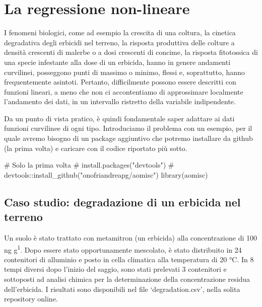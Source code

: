 \documentclass[a4paper,12pt,oneside]{book}
\newenvironment{Shaded}{\begin{snugshade}}{\end{snugshade}}
\newcommand{\CommentTok}[1]{#1}
\newcommand{\FunctionTok}[1]{#1}
\newcommand{\NormalTok}[1]{#1}
\begin{document}
\hypertarget{la-regressione-non-lineare}{%
\chapter{La regressione non-lineare}\label{la-regressione-non-lineare}}

I fenomeni biologici, come ad esempio la crescita di una coltura, la cinetica degradativa degli erbicidi nel terreno, la risposta produttiva delle colture a densità crescenti di malerbe o a dosi crescenti di concime, la risposta fitotossica di una specie infestante alla dose di un erbicida, hanno in genere andamenti curvilinei, posseggono punti di massimo o minimo, flessi e, soprattutto, hanno frequentemente asintoti. Pertanto, difficilmente possono essere descritti con funzioni lineari, a meno che non ci accontentiamo di approssimare localmente l'andamento dei dati, in un intervallo ristretto della variabile indipendente.

Da un punto di vista pratico, è quindi fondamentale saper adattare ai dati funzioni curvilinee di ogni tipo. Introduciamo il problema con un esempio, per il quale avremo bisogno di un package aggiuntivo che potremo installare da github (la prima volta) e caricare con il codice riportato più sotto.

\begin{Shaded}
\begin{Highlighting}[]
\CommentTok{\# Solo la prima volta}
\CommentTok{\# install.packages("devtools")}
\CommentTok{\# devtools::install\_github("onofriandreapg/aomisc")}
\FunctionTok{library}\NormalTok{(aomisc)}
\end{Highlighting}
\end{Shaded}

\hypertarget{caso-studio-degradazione-di-un-erbicida-nel-terreno}{%
\section{Caso studio: degradazione di un erbicida nel terreno}\label{caso-studio-degradazione-di-un-erbicida-nel-terreno}}

Un suolo è stato trattato con metamitron (un erbicida) alla concentrazione di 100 ng g\textsuperscript{1}. Dopo essere stato opportunamente mescolato, è stato distribuito in 24 contenitori di alluminio e posto in cella climatica alla temperatura di 20 °C. In 8 tempi diversi dopo l'inizio del saggio, sono stati prelevati 3 contenitori e sottoposti ad analisi chimica per la determinazione della concentrazione residua dell'erbicida. I risultati sono disponibili nel file `degradation.csv', nella solita repository online.
\end{document}
